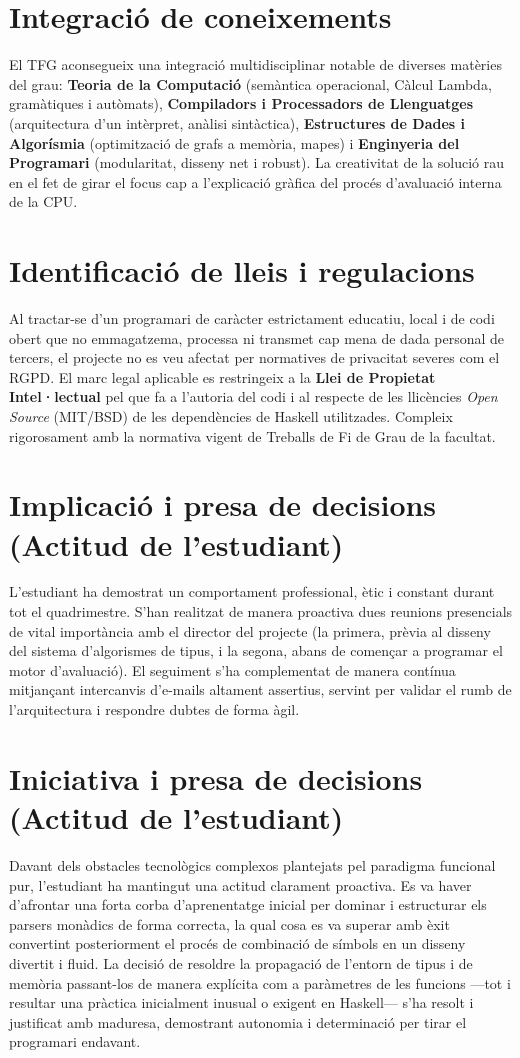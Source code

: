\documentclass[12pt,a4paper]{article}
\begin{document}
\section{Integració de coneixements}
El TFG aconsegueix una integració multidisciplinar notable de diverses matèries del grau: \textbf{Teoria de la Computació} (semàntica operacional, Càlcul Lambda, gramàtiques i autòmats), \textbf{Compiladors i Processadors de Llenguatges} (arquitectura d'un intèrpret, anàlisi sintàctica), \textbf{Estructures de Dades i Algorísmia} (optimització de grafs a memòria, mapes) i \textbf{Enginyeria del Programari} (modularitat, disseny net i robust). La creativitat de la solució rau en el fet de girar el focus cap a l'explicació gràfica del procés d'avaluació interna de la CPU.

\section{Identificació de lleis i regulacions}
Al tractar-se d'un programari de caràcter estrictament educatiu, local i de codi obert que no emmagatzema, processa ni transmet cap mena de dada personal de tercers, el projecte no es veu afectat per normatives de privacitat severes com el RGPD. El marc legal aplicable es restringeix a la \textbf{Llei de Propietat Intel·lectual} pel que fa a l'autoria del codi i al respecte de les llicències \textit{Open Source} (MIT/BSD) de les dependències de Haskell utilitzades. Compleix rigorosament amb la normativa vigent de Treballs de Fi de Grau de la facultat.

\section{Implicació i presa de decisions (Actitud de l'estudiant)}
L'estudiant ha demostrat un comportament professional, ètic i constant durant tot el quadrimestre. S'han realitzat de manera proactiva dues reunions presencials de vital importància amb el director del projecte (la primera, prèvia al disseny del sistema d'algorismes de tipus, i la segona, abans de començar a programar el motor d'avaluació). El seguiment s'ha complementat de manera contínua mitjançant intercanvis d'e-mails altament assertius, servint per validar el rumb de l'arquitectura i respondre dubtes de forma àgil.

\section{Iniciativa i presa de decisions (Actitud de l'estudiant)}
Davant dels obstacles tecnològics complexos plantejats pel paradigma funcional pur, l'estudiant ha mantingut una actitud clarament proactiva. Es va haver d'afrontar una forta corba d'aprenentatge inicial per dominar i estructurar els parsers monàdics de forma correcta, la qual cosa es va superar amb èxit convertint posteriorment el procés de combinació de símbols en un disseny divertit i fluid. La decisió de resoldre la propagació de l'entorn de tipus i de memòria passant-los de manera explícita com a paràmetres de les funcions —tot i resultar una pràctica inicialment inusual o exigent en Haskell— s'ha resolt i justificat amb maduresa, demostrant autonomia i determinació per tirar el programari endavant.
\end{document}

